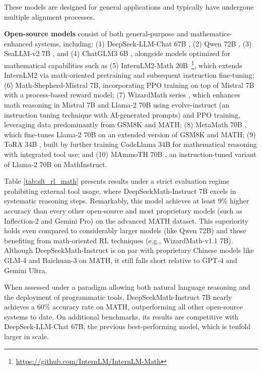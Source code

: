 These models are designed for general applications and typically have undergone multiple alignment processes. 
\item \textbf{Open-source models} consist of both general-purpose and mathematics-enhanced systems, including: (1) DeepSeek-LLM-Chat 67B \citep{deepseek-llm}, (2) Qwen 72B \citep{qwen}, (3) SeaLLM-v2 7B \citep{seallm}, and (4) ChatGLM3 6B \citep{chatglm3}, alongside models optimized for mathematical capabilities such as (5) InternLM2-Math 20B~\footnote{\url{https://github.com/InternLM/InternLM-Math}}, which extends InternLM2 via math-oriented pretraining and subsequent instruction fine-tuning; (6) Math-Shepherd-Mistral 7B, incorporating PPO training \citep{schulman2017proximal} on top of Mistral 7B \citep{mistral} with a process-based reward model; (7) WizardMath series \citep{wizardmath}, which enhances math reasoning in Mistral 7B and Llama-2 70B \citep{llama2} using evolve-instruct (an instruction tuning technique with AI-generated prompts) and PPO training, leveraging data predominantly from GSM8K and MATH; (8) MetaMath 70B \citep{metamath}, which fine-tunes Llama-2 70B on an extended version of GSM8K and MATH; (9) ToRA 34B \cite{tora}, built by further training CodeLlama 34B for mathematical reasoning with integrated tool use; and (10) MAmmoTH 70B \citep{MathInstruct}, an instruction-tuned variant of Llama-2 70B on MathInstruct.

Table \ref{tab:sft_rl_math} presents results under a strict evaluation regime prohibiting external tool usage, where DeepSeekMath-Instruct 7B excels in systematic reasoning steps. Remarkably, this model achieves at least 9\% higher accuracy than every other open-source and most proprietary models (such as Inflection-2 and Gemini Pro) on the advanced MATH dataset. This superiority holds even compared to considerably larger models (like Qwen 72B) and those benefiting from math-oriented RL techniques (e.g., WizardMath-v1.1 7B). Although DeepSeekMath-Instruct is on par with proprietary Chinese models like GLM-4 and Baichuan-3 on MATH, it still falls short relative to GPT-4 and Gemini Ultra.

When assessed under a paradigm allowing both natural language reasoning and the deployment of programmatic tools, DeepSeekMath-Instruct 7B nearly achieves a 60\% accuracy rate on MATH, outperforming all other open-source systems to date. On additional benchmarks, its results are competitive with DeepSeek-LLM-Chat 67B, the previous best-performing model, which is tenfold larger in scale.

